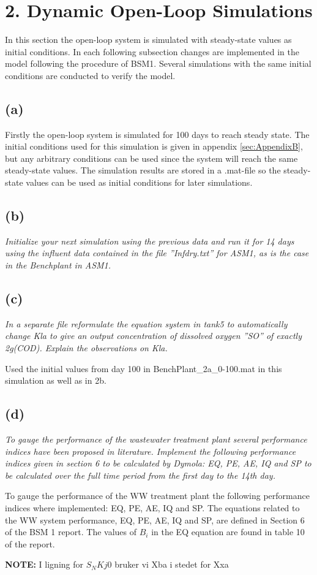 \section*{2. Dynamic Open-Loop Simulations}\label{sec:Assignment2}
In this section the open-loop system is simulated with steady-state values as initial conditions. In each following subsection changes are implemented in the model following the procedure of BSM1. Several simulations with the same initial conditions are conducted to verify the model.

\subsection*{(a)}
Firstly the open-loop system is simulated for 100 days to reach steady state. The initial conditions used for this simulation is given in appendix \ref{sec:AppendixB}, but any arbitrary conditions can be used since the system will reach the same steady-state values. The simulation results are stored in a .mat-file so the steady-state values can be used as initial conditions for later simulations.

\subsection*{(b)}
\textit{Initialize your next simulation using the previous data and run it for 14 days using the influent
data contained in the file ”Infdry.txt” for ASM1, as is the case in the Benchplant in ASM1.}

\subsection*{(c)}
\textit{In a separate file reformulate the equation system in tank5 to automatically change Kla to give an
output concentration of dissolved oxygen ”SO” of exactly 2g(COD). Explain the observations on Kla.}


Used the initial values from day 100 in BenchPlant\_2a\_0-100.mat in this simulation as well as in 2b.


\subsection*{(d)}
\textit{To gauge the performance of the wastewater treatment plant several performance indices have
been proposed in literature. Implement the following performance indices given in section 6
to be calculated by Dymola: EQ, PE, AE, IQ and SP to be calculated over the full time period
from the first day to the 14th day.}

To gauge the performance of the WW treatment plant the following performance indices where implemented: EQ, PE, AE, IQ and SP. The equations related to the WW system performance, EQ, PE, AE, IQ and SP, are defined in Section 6 of the BSM 1 report. The values of $B_i$ in the EQ equation are found in table 10 of the report.  

\textbf{NOTE:} I ligning for $S_NKj0$ bruker vi Xba i stedet for Xxa 
